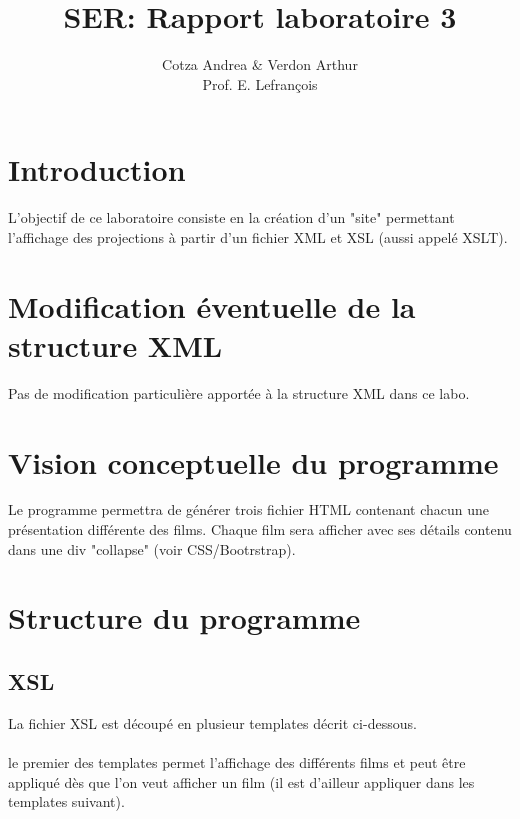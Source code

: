 \documentclass[french]{article}
\begin{document}
	\title{SER: Rapport laboratoire 3}
	\author{Cotza Andrea \& Verdon Arthur\\Prof. E. Lefrançois}
	\maketitle
    \vspace{5cm}
    \tableofcontents
    \newpage

    \section{Introduction}
    L'objectif de ce laboratoire consiste en la création d'un "site" permettant
    l'affichage des projections à partir d'un fichier XML et XSL (aussi appelé
    XSLT).

    \section{Modification éventuelle de la structure XML}
    Pas de modification particulière apportée à la structure XML dans ce labo.

    \section{Vision conceptuelle du programme}
    Le programme permettra de générer trois fichier HTML contenant chacun une
    présentation différente des films. Chaque film sera afficher avec ses détails
    contenu dans une div "collapse" (voir CSS/Bootrstrap).

    \section{Structure du programme}
    \subsection{XSL}
    La fichier XSL est découpé en plusieur templates décrit ci-dessous.
    \vspace{5}
    \\\\le premier des templates permet l'affichage des différents films et peut
    être appliqué dès que l'on veut afficher un film (il est d'ailleur appliquer
    dans les templates suivant).
    
    \vspace{30}
\end{document}
